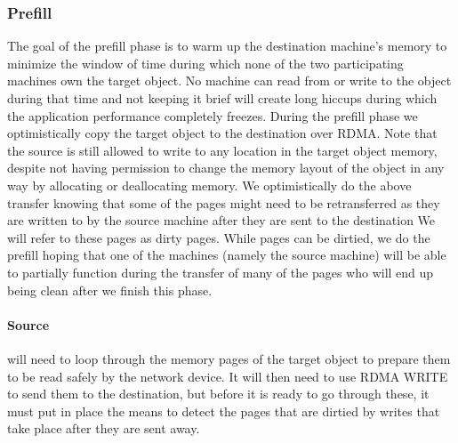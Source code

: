 \subsubsection{Prefill}
The goal of the prefill phase is to warm up the destination machine's memory to
minimize the window of time during which none of the two participating machines
own the target object. No machine can read from or write to the object during
that time and not keeping it brief will create long hiccups during which the
application performance completely freezes. During the prefill phase we
optimistically copy the target object to the destination over RDMA. Note that
the source is still allowed to write to any location in the target object
memory, despite not having permission to change the memory layout of the object
in any way by allocating or deallocating memory. We optimistically do the above
transfer knowing that some of the pages might need to be retransferred as they
are written to by the source machine after they are sent to the destination
We will refer to these pages as dirty pages. While pages can be
dirtied, we do the prefill hoping that one of the
machines (namely the source machine) will be able to partially function during
the transfer of many of the pages who will end up being clean after we finish
this phase.

\paragraph{Source} will need to loop through the memory pages of the target
object to prepare them to be read safely by the network device. It will then
need to use RDMA WRITE to send them to the destination, but before it is ready
to go through these, it must put in place the means to detect the pages that
are dirtied by writes that take place after they are sent away.

